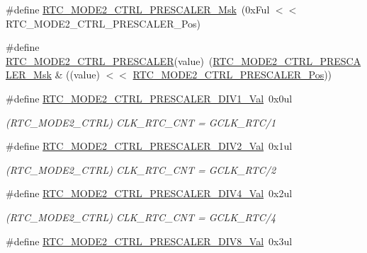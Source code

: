 \begin{DoxyCompactItemize}
\#define \mbox{\hyperlink{group___s_a_m_d21___r_t_c_ga9b4f584297c190f9dee12c8f7d1051be}{R\+T\+C\+\_\+\+M\+O\+D\+E2\+\_\+\+C\+T\+R\+L\+\_\+\+P\+R\+E\+S\+C\+A\+L\+E\+R\+\_\+\+Msk}}~(0x\+Ful $<$$<$ R\+T\+C\+\_\+\+M\+O\+D\+E2\+\_\+\+C\+T\+R\+L\+\_\+\+P\+R\+E\+S\+C\+A\+L\+E\+R\+\_\+\+Pos)
\item 
\#define \mbox{\hyperlink{group___s_a_m_d21___r_t_c_ga3290ecaab99a922dce58e44116432758}{R\+T\+C\+\_\+\+M\+O\+D\+E2\+\_\+\+C\+T\+R\+L\+\_\+\+P\+R\+E\+S\+C\+A\+L\+ER}}(value)~(\mbox{\hyperlink{group___s_a_m_d21___r_t_c_ga9b4f584297c190f9dee12c8f7d1051be}{R\+T\+C\+\_\+\+M\+O\+D\+E2\+\_\+\+C\+T\+R\+L\+\_\+\+P\+R\+E\+S\+C\+A\+L\+E\+R\+\_\+\+Msk}} \& ((value) $<$$<$ \mbox{\hyperlink{group___s_a_m_d21___r_t_c_gab49acaac9629f089845263f149b8a6c0}{R\+T\+C\+\_\+\+M\+O\+D\+E2\+\_\+\+C\+T\+R\+L\+\_\+\+P\+R\+E\+S\+C\+A\+L\+E\+R\+\_\+\+Pos}}))
\item 
\#define \mbox{\hyperlink{group___s_a_m_d21___r_t_c_ga8bcb27a42c2264c342c2516e9b00e121}{R\+T\+C\+\_\+\+M\+O\+D\+E2\+\_\+\+C\+T\+R\+L\+\_\+\+P\+R\+E\+S\+C\+A\+L\+E\+R\+\_\+\+D\+I\+V1\+\_\+\+Val}}~0x0ul
\begin{DoxyCompactList}\small\item\em (R\+T\+C\+\_\+\+M\+O\+D\+E2\+\_\+\+C\+T\+RL) C\+L\+K\+\_\+\+R\+T\+C\+\_\+\+C\+NT = G\+C\+L\+K\+\_\+\+R\+T\+C/1 \end{DoxyCompactList}\item 
\#define \mbox{\hyperlink{group___s_a_m_d21___r_t_c_ga81400ad86b59d26d3ee9842a8d2c4a51}{R\+T\+C\+\_\+\+M\+O\+D\+E2\+\_\+\+C\+T\+R\+L\+\_\+\+P\+R\+E\+S\+C\+A\+L\+E\+R\+\_\+\+D\+I\+V2\+\_\+\+Val}}~0x1ul
\begin{DoxyCompactList}\small\item\em (R\+T\+C\+\_\+\+M\+O\+D\+E2\+\_\+\+C\+T\+RL) C\+L\+K\+\_\+\+R\+T\+C\+\_\+\+C\+NT = G\+C\+L\+K\+\_\+\+R\+T\+C/2 \end{DoxyCompactList}\item 
\#define \mbox{\hyperlink{group___s_a_m_d21___r_t_c_ga7075835115eb6138d8a729068575f7c8}{R\+T\+C\+\_\+\+M\+O\+D\+E2\+\_\+\+C\+T\+R\+L\+\_\+\+P\+R\+E\+S\+C\+A\+L\+E\+R\+\_\+\+D\+I\+V4\+\_\+\+Val}}~0x2ul
\begin{DoxyCompactList}\small\item\em (R\+T\+C\+\_\+\+M\+O\+D\+E2\+\_\+\+C\+T\+RL) C\+L\+K\+\_\+\+R\+T\+C\+\_\+\+C\+NT = G\+C\+L\+K\+\_\+\+R\+T\+C/4 \end{DoxyCompactList}\item 
\#define \mbox{\hyperlink{group___s_a_m_d21___r_t_c_gac387bb79731665371da7bfbd1487dec0}{R\+T\+C\+\_\+\+M\+O\+D\+E2\+\_\+\+C\+T\+R\+L\+\_\+\+P\+R\+E\+S\+C\+A\+L\+E\+R\+\_\+\+D\+I\+V8\+\_\+\+Val}}~0x3ul

\end{DoxyCompactItemize}
